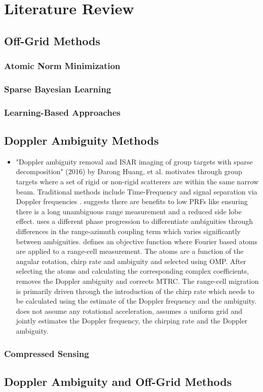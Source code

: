 
\chapter{Literature Review}



\section{Off-Grid Methods}

\subsection{Atomic Norm Minimization}

\subsection{Sparse Bayesian Learning}

\subsection{Learning-Based Approaches}

\section{Doppler Ambiguity Methods}

\begin{itemize}
\item "Doppler ambiguity removal and ISAR imaging of group targets with sparse decomposition" (2016) by Darong Huang, et al. motivates through group targets where a set of rigid or non-rigid scatterers are within the same narrow beam. Traditional methods include Time-Frequency and signal separation via Doppler frequencies \cite{Huang2016}. \cite{Huang2016} suggests there are benefits to low PRFs like ensuring there is a long unambiguous range measurement and a reduced side lobe effect. \cite{Huang2016} uses a different phase progression to differentiate ambiguities through differences in the range-azimuth coupling term which varies significantly between ambiguities. \cite{Huang2016} defines an objective function where Fourier based atoms are applied to a range-cell measurement. The atoms are a function of the angular rotation, chirp rate and ambiguity and selected using OMP. After selecting the atoms and calculating the corresponding complex coefficients, \cite{Huang2016} removes the Doppler ambiguity and corrects MTRC. The range-cell migration is primarily driven through the introduction of the chirp rate which needs to be calculated using the estimate of the Doppler frequency and the ambiguity. \cite{Huang2016} does not assume any rotational acceleration, assumes a uniform grid and jointly estimates the Doppler frequency, the chirping rate and the Doppler ambiguity.  
\end{itemize}

\subsection{Compressed Sensing}

\section{Doppler Ambiguity and Off-Grid Methods}


